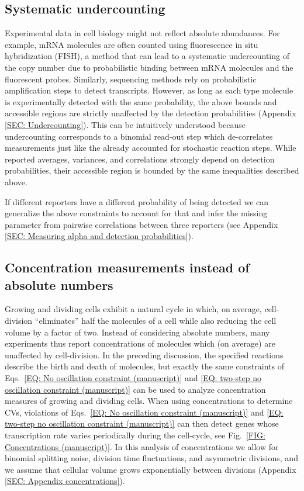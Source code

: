 \documentclass[%
 reprint,prx,
superscriptaddress,
%
%
%
%
%
%
%
%
%
 amsmath,amssymb,
 aps,
%
%
%
%
%
%
]{revtex4-2}
\begin{document}
\vspace{-.5em}
\subsection{Systematic undercounting}\vspace{-.75em}
%
Experimental data in cell biology might not reflect absolute abundances. For example, mRNA molecules are often counted using fluorescence in situ hybridization (FISH), a method that can lead to a systematic undercounting of the copy number due to probabilistic binding between mRNA molecules and the fluorescent probes. Similarly, sequencing methods rely on probabilistic amplification steps to detect transcripts. %
However, as long as each type molecule is experimentally detected with the same probability, the above bounds and accessible regions are strictly unaffected by the detection probabilities (Appendix \ref{SEC: Undercounting}). This can be intuitively understood because undercounting corresponds to a binomial read-out step which de-correlates measurements just like the already accounted for  stochastic reaction steps. While reported averages, variances, and correlations strongly depend on detection probabilities, their accessible region is bounded by the same inequalities described above.


If different reporters have a different probability of being detected we can generalize the above constraints to account for that and infer the missing parameter from pairwise correlations between three reporters (see Appendix \ref{SEC: Measuring alpha and detection probabilities}). 


\vspace{-.5em}
\subsection{Concentration measurements instead of absolute numbers}\vspace{-.75em}
Growing and dividing cells exhibit a natural cycle in which, on average, cell-division ``eliminates'' half the molecules of a cell while also reducing the cell volume by a factor of two. Instead of considering absolute numbers, many experiments thus report concentrations of molecules which (on average) are unaffected by cell-division. In the preceding discussion, the specified reactions describe the birth and death of molecules, but exactly the same constraints of Eqs.~\eqref{EQ: No oscillation constraint (manuscript)} and \eqref{EQ: two-step no oscillation constraint (manuscript)} can be used to analyze concentration measures of growing and dividing cells. When using concentrations to determine CVs, violations of Eqs.~\eqref{EQ: No oscillation constraint (manuscript)} and \eqref{EQ: two-step no oscillation constraint (manuscript)} can then detect genes whose transcription rate varies periodically during the cell-cycle, see Fig.~\ref{FIG: Concentrations (manuscript)}. In this analysis of concentrations we allow for binomial splitting noise, division time fluctuations, and asymmetric divisions, and we assume that cellular volume grows exponentially between divisions (Appendix \ref{SEC: Appendix concentrations}).
\end{document}
